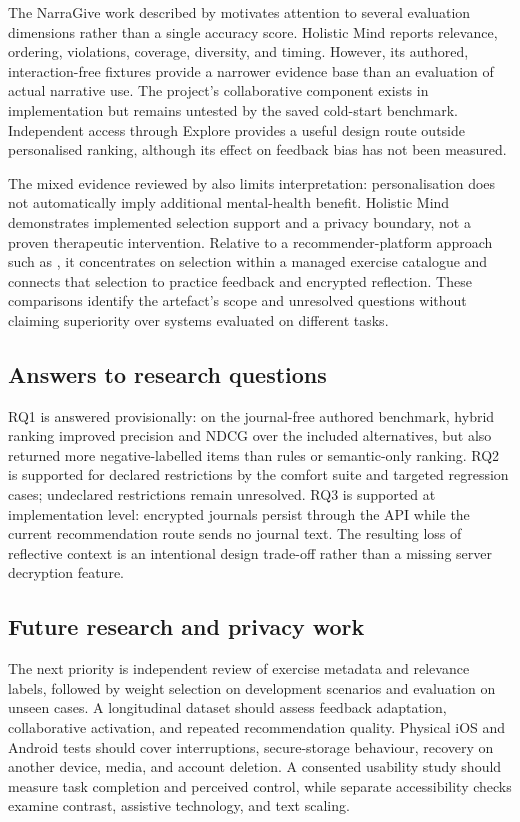 The NarraGive work described by \citet{slade2024} motivates attention to several evaluation dimensions rather than a single accuracy score. Holistic Mind reports relevance, ordering, violations, coverage, diversity, and timing. However, its authored, interaction-free fixtures provide a narrower evidence base than an evaluation of actual narrative use. The project's collaborative component exists in implementation but remains untested by the saved cold-start benchmark. Independent access through Explore provides a useful design route outside personalised ranking, although its effect on feedback bias has not been measured.

The mixed evidence reviewed by \citet{matthews2025} also limits interpretation: personalisation does not automatically imply additional mental-health benefit. Holistic Mind demonstrates implemented selection support and a privacy boundary, not a proven therapeutic intervention. Relative to a recommender-platform approach such as \citet{tapuria2024}, it concentrates on selection within a managed exercise catalogue and connects that selection to practice feedback and encrypted reflection. These comparisons identify the artefact's scope and unresolved questions without claiming superiority over systems evaluated on different tasks.

\subsection{Answers to research questions}

RQ1 is answered provisionally: on the journal-free authored benchmark, hybrid ranking improved precision and NDCG over the included alternatives, but also returned more negative-labelled items than rules or semantic-only ranking. RQ2 is supported for declared restrictions by the comfort suite and targeted regression cases; undeclared restrictions remain unresolved. RQ3 is supported at implementation level: encrypted journals persist through the API while the current recommendation route sends no journal text. The resulting loss of reflective context is an intentional design trade-off rather than a missing server decryption feature.

\subsection{Future research and privacy work}

The next priority is independent review of exercise metadata and relevance labels, followed by weight selection on development scenarios and evaluation on unseen cases. A longitudinal dataset should assess feedback adaptation, collaborative activation, and repeated recommendation quality. Physical iOS and Android tests should cover interruptions, secure-storage behaviour, recovery on another device, media, and account deletion. A consented usability study should measure task completion and perceived control, while separate accessibility checks examine contrast, assistive technology, and text scaling.

